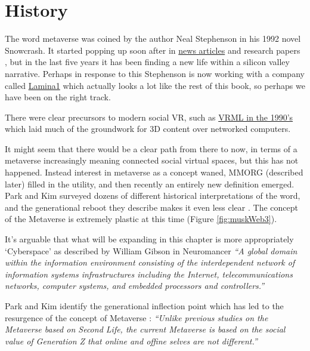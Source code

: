 \section{History}
The word metaverse was coined by the author Neal Stephenson in his 1992 novel Snowcrash. It started popping up soon after in \href{https://www.newscientist.com/article/mg14819994-000-how-to-build-a-metaverse/}{news articles} and research papers \cite{mclellan1993avatars}, but in the last five years it has been finding a new life within a silicon valley narrative. Perhaps in response to this Stephenson is now working with a company called \href{https://www.lamina1.com/}{Lamina1} which actually looks a lot like the rest of this book, so perhaps we have been on the right track.\par
There were clear precursors to modern social VR, such as \href{https://www.howtogeek.com/778554/remembering-vrml-the-metaverse-of-1995/}{VRML in the 1990's} which laid much of the groundwork for 3D content over networked computers.\par%
It might seem that there would be a clear path from there to now, in terms of a metaverse increasingly meaning connected social virtual spaces, but this has not happened. Instead interest in metaverse as a concept waned, MMORG (described later) filled in the utility, and then recently an entirely new definition emerged. Park and Kim surveyed dozens of different historical interpretations of the word, and the generational reboot they describe makes it even less clear \cite{park2022metaverse}. The concept of the Metaverse is extremely plastic at this time (Figure \ref{fig:muskWeb3}).\par
It's arguable that what will be expanding in this chapter is more appropriately `Cyberspace' as described by William Gibson in Neuromancer \cite{gibson2019neuromancer} \textit{``A global domain within the information environment consisting of the interdependent network of information systems infrastructures including the Internet, telecommunications networks, computer systems, and embedded processors and controllers.''}\par
Park and Kim identify the generational inflection point which has led to the resurgence of the concept of Metaverse \cite{park2022metaverse}: 
\textit{``Unlike previous studies on the Metaverse based on Second Life, the current Metaverse is based on the social value of Generation Z that online and offine selves are not different.''} \par

